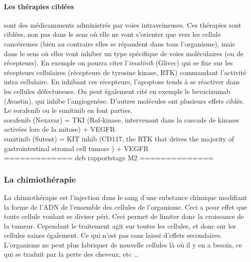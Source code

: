 \documentclass[main.tex]{subfiles}
\begin{document}
\paragraph{Les thérapies ciblées} sont des médicamments administrés par voies intraveineuses. Ces thérapies sont ciblées, non pas dans le sens où elle ne vont s'orienter que vers les cellule cancéreuses (bien au contraire elles se répandent dans tous l'organisme), mais dans le sens où elles vont inhiber un type spécifique de voies moléculaires (ou de récepteurs). En exemple on pourra citer l'\emph{imatinib} (Glivec) qui se fixe sur les récepteurs cellulaires (récepteurs de tyrosine kinase, RTK) commandant l'activité intra cellulaire. En inhibant ces récepteurs, l'apoptose tends à se réactiver dans les cellules défectuesues. On peut également cité en exemple le bevacizumab (Avastin), qui inhibe l'angiogenèse. D'autres molécules ont plusieurs effets ciblés. Le sorafenib ou le sunitinib en font parties.\\
sorafenib (Nexavar) =  TKI (Raf-kinase, intervenant dans la cascade de kinases activées lors de la mitose) + VEGFR \\
sunitinib (Sutent) =  KIT inhib (CD117, the RTK that drives the majority of gastrointestinal stromal cell tumors ) + VEGFR \\


============= deb rapportstage M2 ==============\\

\subsubsection{La chimiothérapie}
La chimiothérapie est l'injection dans le sang d'une substance chimique modifiant la forme de l'ADN de l'ensemble des cellules de l'organisme. Ceci a pour effet que toute cellule voulant se diviser péri. Ceci permet de limiter donc la croissance de la tumeur. Cependant le traitement agit sur toutes les cellules, et donc sur les cellules saines également. Ce qui n'est pas sans laissé d'effets secondaires. L'organisme ne peut plus fabriquer de nouvelle cellules là où il y en a besoin, ce qui se traduit par la perte des cheveux, etc \ldots
\end{document}
